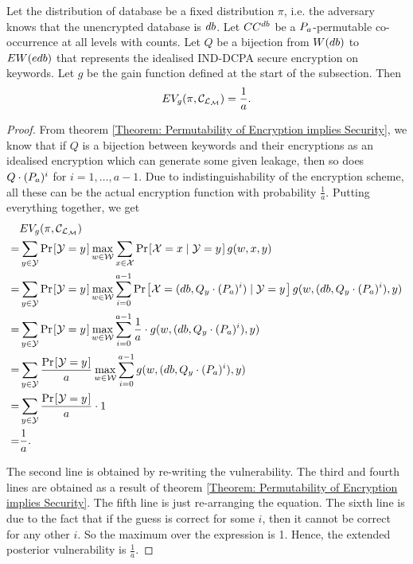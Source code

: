 \begin{proposition} \label{Proposition: g-vulnerability of Inference Attack}
Let the distribution of database be a fixed distribution $\pi$, i.e. the adversary knows that the unencrypted database is $db$. Let $CC^{db}$ be a $P_a$-permutable co-occurrence at all levels with counts. Let $Q$ be a bijection from $W(db)$ to $EW(edb)$ that represents the idealised IND-DCPA secure encryption on keywords. Let $g$ be the gain function defined at the start of the subsection. Then
\begin{equation}
	EV_g(\pi, \mathcal{C}_{\mathcal{L}_\mathcal{M}}) = \frac{1}{a}.
\end{equation}
\end{proposition}


\begin{proof}
From theorem \ref{Theorem: Permutability of Encryption implies Security}, we know that if $Q$ is a bijection between keywords and their encryptions as an idealised encryption which can generate some given leakage, then so does $Q \cdot (P_a)^i$ for $i=1,\dots, a-1$. Due to indistinguishability of the encryption scheme, all these can be the actual encryption function with probability $\frac{1}{a}$. Putting everything together, we get
\begin{align*}
  &EV_g(\pi, \channelm)\\
= &\sum_{y \in {\mathcal{Y}}} \prob{\mathcal{Y} = y} \max_{w \in {\mathcal{W}}} \sum_{x \in {\mathcal{X}}} \prob{\mathcal{X} = x \mid \mathcal{Y} = y} g(w, x, y) \\
= &\sum_{y \in {\mathcal{Y}}} \prob{\mathcal{Y} = y} \max_{w \in {\mathcal{W}}} \sum_{i = 0}^{a-1} \prob{\mathcal{X} = (\db, Q_y \cdot (\perm_a)^i) \mid \mathcal{Y} = y} g(w, (\db, Q_y \cdot (\perm_a)^i), y) \\
= &\sum_{y \in {\mathcal{Y}}} \prob{\mathcal{Y} = y} \max_{w \in {\mathcal{W}}} \sum_{i = 0}^{a-1} \frac{1}{a} \cdot g(w, (\db, Q_y \cdot (\perm_a)^i), y) \\
= &\sum_{y \in {\mathcal{Y}}} \frac{\prob{\mathcal{Y} = y}}{a} \max_{w \in {\mathcal{W}}} \sum_{i = 0}^{a-1} g(w, (\db, Q_y \cdot (\perm_a)^i), y) \\
= &\sum_{y \in {\mathcal{Y}}} \frac{\prob{\mathcal{Y} = y}}{a} \cdot 1 \\
= & \frac{1}{a}.
\end{align*}

The second line is obtained by re-writing the vulnerability. The third and fourth lines are obtained as a result of theorem \ref{Theorem: Permutability of Encryption implies Security}. The fifth line is just re-arranging the equation. The sixth line is due to the fact that if the guess is correct for some $i$, then it cannot be correct for any other $i$. So the maximum over the expression is 1. Hence, the extended posterior vulnerability is $\frac{1}{a}$.
\end{proof}


